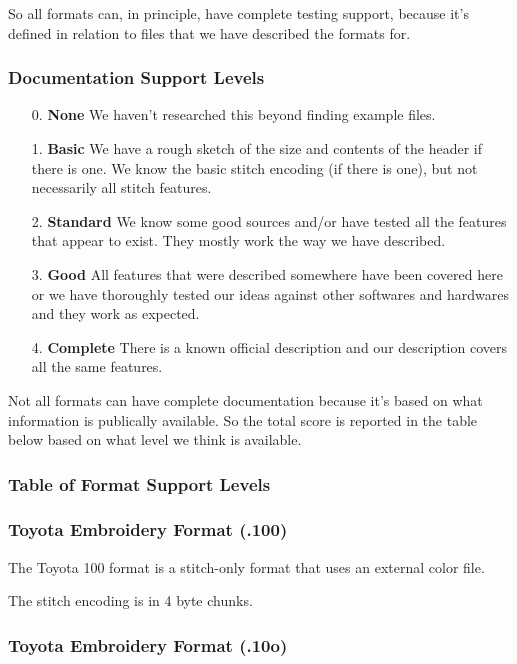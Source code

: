 \documentclass[a4paper, 11pt]{report}
\begin{document}
So all formats can, in principle, have complete testing support, because it's defined in relation to files that we have described the formats for.

\subsubsection{Documentation Support Levels}

\begin{enumerate}
\item[0.] \textbf{None} We haven't researched this beyond finding example files.
\item[1.] \textbf{Basic} We have a rough sketch of the size and contents of the header if there is one. We know the basic stitch encoding (if there is one), but not necessarily all stitch features. 
\item[2.] \textbf{Standard} We know some good sources and/or have tested all the features that appear to exist. They mostly work the way we have described.
\item[3.] \textbf{Good} All features that were described somewhere have been covered here or we have thoroughly tested our ideas against other softwares and hardwares and they work as expected. 
\item[4.] \textbf{Complete} There is a known official description and our description covers all the same features.
\end{enumerate}

Not all formats can have complete documentation because it's based on what 
information is publically available. So the total score is reported in the table
below based on what level we think is available.

\subsubsection{Table of Format Support Levels}



\subsubsection{Toyota Embroidery Format (.100)}

The Toyota 100 format is a stitch-only format that uses an external color file.

The stitch encoding is in 4 byte chunks.

\subsubsection{Toyota Embroidery Format (.10o)}
\end{document}

